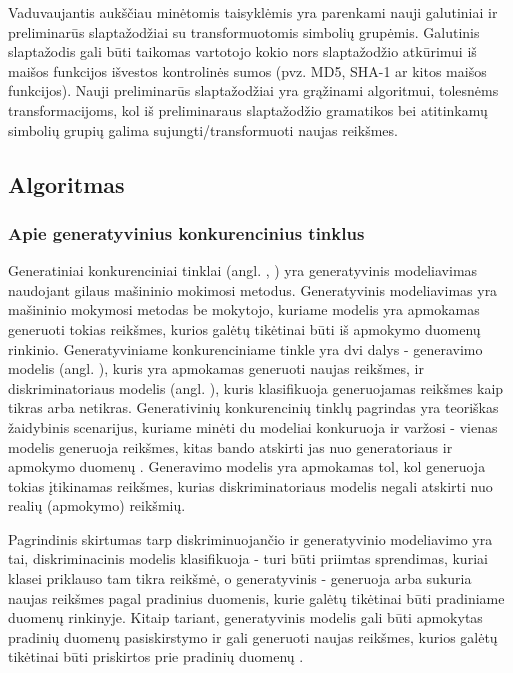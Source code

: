 \documentclass{VUMIFInfBakalaurinis}
\begin{document}
Vaduvaujantis aukščiau minėtomis taisyklėmis yra parenkami nauji galutiniai ir 
preliminarūs slaptažodžiai su transformuotomis simbolių grupėmis. Galutinis 
slaptažodis gali būti taikomas vartotojo kokio nors slaptažodžio atkūrimui iš 
maišos funkcijos išvestos kontrolinės sumos (pvz. MD5, SHA-1 ar kitos maišos 
funkcijos). Nauji preliminarūs slaptažodžiai yra grąžinami algoritmui, tolesnėms 
transformacijoms, kol iš preliminaraus slaptažodžio gramatikos bei atitinkamų 
simbolių grupių galima sujungti/transformuoti naujas reikšmes.

\subsection{ Algoritmas}
\subsubsection{Apie generatyvinius konkurencinius tinklus}
Generatiniai konkurenciniai tinklai (angl. , ) yra generatyvinis modeliavimas naudojant gilaus 
mašininio mokimosi metodus. Generatyvinis modeliavimas yra mašininio mokymosi 
metodas be mokytojo, kuriame modelis yra apmokamas generuoti tokias reikšmes, 
kurios galėtų tikėtinai būti iš apmokymo duomenų rinkinio. Generatyviniame 
konkurenciniame tinkle yra dvi dalys - generavimo modelis (angl. 
), kuris yra apmokamas generuoti naujas reikšmes, ir 
diskriminatoriaus modelis (angl. ), kuris 
klasifikuoja generuojamas reikšmes kaip tikras arba netikras. Generativinių 
konkurencinių tinklų pagrindas yra teoriškas žaidybinis scenarijus, kuriame 
minėti du modeliai konkuruoja ir varžosi - vienas modelis generuoja reikšmes, 
kitas bando atskirti jas nuo generatoriaus ir apmokymo duomenų 
\cite{Goodfellow-et-al-2016}. Generavimo modelis yra apmokamas tol, kol 
generuoja tokias įtikinamas reikšmes, kurias diskriminatoriaus modelis negali 
atskirti nuo realių (apmokymo) reikšmių.

Pagrindinis skirtumas tarp diskriminuojančio ir generatyvinio modeliavimo yra 
tai, diskriminacinis modelis klasifikuoja - turi būti priimtas sprendimas, 
kuriai klasei priklauso tam tikra reikšmė, o generatyvinis - generuoja arba 
sukuria naujas reikšmes pagal pradinius duomenis, kurie galėtų tikėtinai būti 
pradiniame duomenų rinkinyje. Kitaip tariant, generatyvinis modelis gali būti 
apmokytas pradinių duomenų pasiskirstymo ir gali generuoti naujas reikšmes, 
kurios galėtų tikėtinai būti priskirtos prie pradinių duomenų \cite{Bishop07}.
\end{document}
